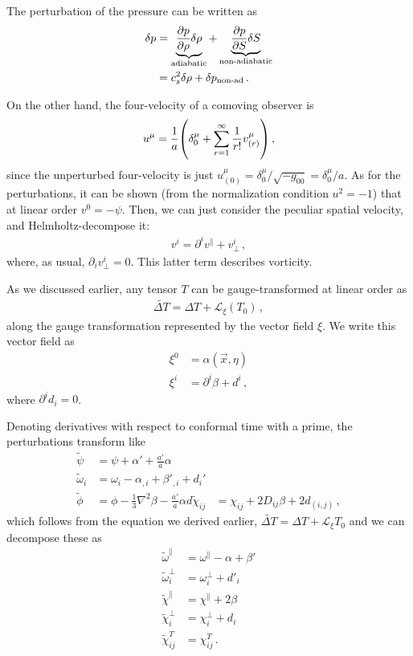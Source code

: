 \documentclass[main.tex]{subfiles}
\begin{document}
The perturbation of the pressure can be written as 
%
\begin{align}
\delta p &= \underbrace{\pdv{p}{\rho } \delta \rho }_{\text{adiabatic}} 
+ \underbrace{\pdv{p}{S} \delta S}_{\text{non-adiabatic}}  \\
&= c_s^2 \delta \rho + \delta p _{\text{non-ad}}
\,.
\end{align}

On the other hand, the four-velocity of a comoving observer is 
%
\begin{align}
u^{\mu } = \frac{1}{a} \qty(\delta^{\mu }_{0} + \sum _{r=1}^{\infty } \frac{1}{r!} v^{\mu }_{(r)})
\,,
\end{align}
%
since the unperturbed four-velocity is just \(u^{\mu }_{(0)} = \delta^{\mu }_0  / \sqrt{- g_{00} } = \delta^{\mu }_{0} / a\).
As for the perturbations, it can be shown (from the normalization condition \(u^2= -1\)) that at linear order \(v^{0} = - \psi \). 
Then, we can just consider the peculiar spatial velocity, and Helmholtz-decompose it: 
%
\begin{align}
v^{i} = \partial^{i} v^{\parallel} + v^{i}_\perp
\,,
\end{align}
%
where, as usual, \(\partial_{i} v^{i}_\perp = 0\). 
This latter term describes vorticity. 

As we discussed earlier, any tensor \(T\) can be gauge-transformed at linear order as 
%
\begin{align}
\widetilde{\Delta T} = \Delta T + \mathscr{L}_\xi (T_0 )
\,,
\end{align}
%
along the gauge transformation represented by the vector field \(\xi \). 
We write this vector field as 
%
\begin{align}
\xi^{0} &= \alpha (\vec{x}, \eta )  \\
\xi^{i} &= \partial^{i} \beta + d^{i}
\,,
\end{align}
%
where \(\partial^{i} d_i = 0\). 

Denoting derivatives with respect to conformal time with a prime, the perturbations transform like 
%
\begin{align}
\widetilde{\psi} &= \psi + \alpha ' + \frac{a'}{a} \alpha   \\
\widetilde{\omega}_i &= \omega _i - \alpha_{, i} + \beta'_{, i} + d _i'   \\ 
\widetilde{\phi} &= \phi - \frac{1}{3} \nabla^2 \beta - \frac{a'}{a} \alpha d
\widetilde{\chi}_{ij} &= \chi_{ij} + 2 D_{ij} \beta + 2d_{(i, j)} 
\,,
\end{align}
%
which follows from the equation we derived earlier, \(\widetilde{\Delta T}  = \Delta T + \mathscr{L}_\xi T_0  \)
and we can decompose these as 
%
\begin{align}
\widetilde{\omega}^{\parallel} &= \omega^{\parallel} - \alpha + \beta '  \\
\widetilde{\omega}^{\perp}_i &= \omega^{\perp}_i + d'_i  \\
\widetilde{\chi}^{\parallel } &= \chi^{\parallel} + 2 \beta   \\
\widetilde{\chi}^{\perp}_i &= \chi^{\perp}_i + d _i  \\
\widetilde{\chi}^{T}_{ij} &= \chi^{T}_{ij}
\,.
\end{align}
\end{document}
